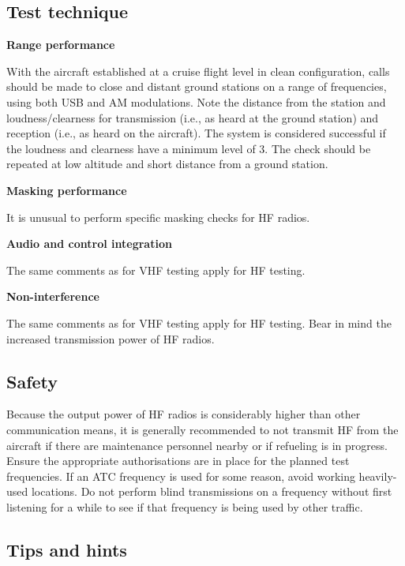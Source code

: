 \documentclass[
]{book}
\begin{document}
\hypertarget{test-technique-1}{%
\subsection{Test technique}\label{test-technique-1}}

\textbf{Range performance}

With the aircraft established at a cruise flight level in clean configuration,
calls should be made to close and distant ground stations on a range of
frequencies, using both USB and AM modulations. Note the distance from the
station and loudness/clearness for transmission (i.e., as heard at the ground
station) and reception (i.e., as heard on the aircraft). The system is
considered successful if the loudness and clearness have a minimum level of 3.
The check should be repeated at low altitude and short distance from a ground
station.

\textbf{Masking performance}

It is unusual to perform specific masking checks for HF radios.

\textbf{Audio and control integration}

The same comments as for VHF testing apply for HF testing.

\textbf{Non-interference}

The same comments as for VHF testing apply for HF testing. Bear in mind the
increased transmission power of HF radios.

\hypertarget{safety-1}{%
\subsection{Safety}\label{safety-1}}

Because the output power of HF radios is considerably higher than other
communication means, it is generally recommended to not transmit HF from the
aircraft if there are maintenance personnel nearby or if refueling is in
progress. Ensure the appropriate authorisations are in place for the planned
test frequencies. If an ATC frequency is used for some reason, avoid working
heavily-used locations. Do not perform blind transmissions on a frequency
without first listening for a while to see if that frequency is being used by
other traffic.

\hypertarget{tips-and-hints-1}{%
\subsection{Tips and hints}\label{tips-and-hints-1}}
\end{document}
